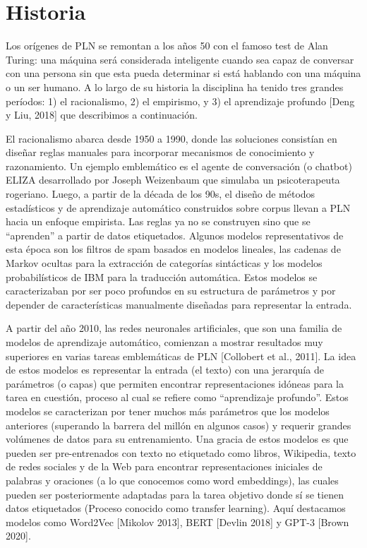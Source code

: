 \documentclass{book}
\begin{document}
\section{Historia}

Los orígenes de PLN se remontan a los años 50 con el famoso test de Alan Turing: una máquina será considerada inteligente cuando sea capaz de conversar con una persona sin que esta pueda determinar si está hablando con una máquina o un ser humano. A lo largo de su historia la disciplina ha tenido tres grandes períodos: 1) el racionalismo, 2) el empirismo, y 3) el aprendizaje profundo [Deng y Liu, 2018] que describimos a continuación.

El racionalismo abarca desde 1950 a 1990, donde las soluciones consistían en diseñar reglas manuales para incorporar mecanismos de conocimiento y razonamiento. Un ejemplo emblemático es el agente de conversación (o chatbot) ELIZA desarrollado por Joseph Weizenbaum que simulaba  un psicoterapeuta rogeriano. Luego, a partir de la década de los 90s, el diseño de métodos estadísticos y de aprendizaje automático construidos sobre corpus llevan a PLN hacia un enfoque empirista. Las reglas ya no se construyen sino que se “aprenden” a partir de datos etiquetados.  Algunos modelos representativos de esta época son los filtros de spam basados en modelos lineales, las cadenas de Markov ocultas para la extracción de categorías sintácticas y los modelos probabilísticos de IBM para la traducción automática. Estos modelos se caracterizaban por ser poco profundos en su estructura de parámetros y por depender de características manualmente diseñadas para representar la entrada.

A partir del año 2010, las redes neuronales artificiales, que son una familia de modelos de aprendizaje automático, comienzan a mostrar resultados muy superiores en varias tareas emblemáticas de PLN [Collobert et al., 2011]. La idea de estos modelos es representar la entrada (el texto) con una jerarquía de parámetros (o capas) que permiten encontrar representaciones idóneas para la tarea en cuestión, proceso al cual se refiere como “aprendizaje profundo”. Estos modelos se caracterizan por tener muchos más parámetros que los modelos anteriores (superando la barrera del millón en algunos casos) y requerir grandes volúmenes de datos para su entrenamiento. Una gracia de estos modelos es que pueden ser pre-entrenados con texto no etiquetado como libros, Wikipedia, texto de redes sociales y de la Web para encontrar representaciones iniciales de palabras y oraciones (a lo que conocemos como word embeddings),  las cuales pueden ser posteriormente adaptadas para la tarea objetivo donde sí se tienen datos etiquetados (Proceso conocido como transfer learning). Aquí destacamos modelos como Word2Vec [Mikolov 2013], BERT  [Devlin 2018] y GPT-3  [Brown 2020].
\end{document}
